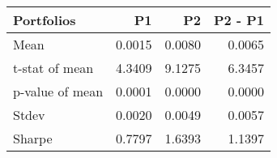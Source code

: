 \begin{tabular}{lrrr}
\toprule
Portfolios & P1 & P2 & P2 - P1 \\
\midrule
Mean & 0.0015 & 0.0080 & 0.0065 \\
t-stat of mean & 4.3409 & 9.1275 & 6.3457 \\
p-value of mean & 0.0001 & 0.0000 & 0.0000 \\
Stdev & 0.0020 & 0.0049 & 0.0057 \\
Sharpe & 0.7797 & 1.6393 & 1.1397 \\
\bottomrule
\end{tabular}
